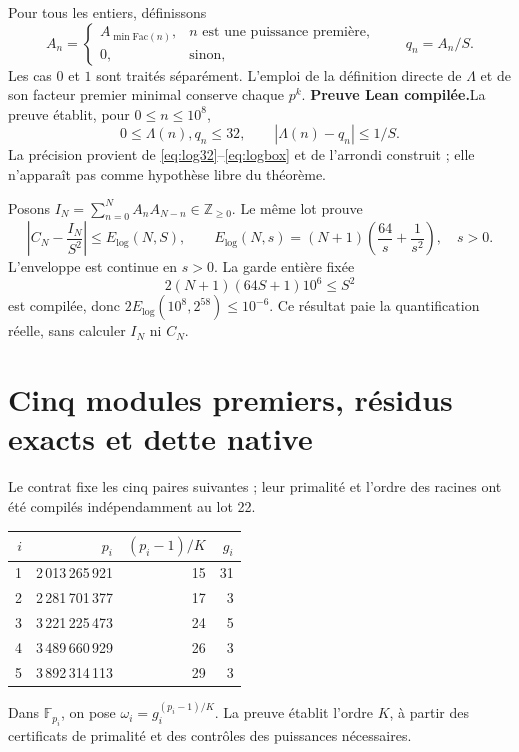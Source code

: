 \documentclass[11pt,a4paper]{article}
\theoremstyle{remark}
\newcommand{\Lam}{\Lambda}
\newcommand{\Z}{\mathbb Z}
\newcommand{\paid}{\textbf{Preuve Lean compilée.}\space}
\begin{document}
Pour tous les entiers, définissons
\[
A_n=\begin{cases}
A_{\min\mathrm{Fac}(n)},& n\text{ est une puissance première},\\
0,&\text{sinon},
\end{cases}\qquad q_n=A_n/S.
\]
Les cas $0$ et $1$ sont traités séparément. L'emploi de la définition directe
de $\Lam$ et de son facteur premier minimal conserve chaque $p^k$.
\paid La preuve établit, pour $0\le n\le10^8$,
\begin{equation}\label{eq:q-error}
0\le\Lam(n),q_n\le32,\qquad |\Lam(n)-q_n|\le 1/S.
\end{equation}
La précision provient de \eqref{eq:log32}--\eqref{eq:logbox} et de l'arrondi
construit ; elle n'apparaît pas comme hypothèse libre du théorème.

Posons $I_N=\sum_{n=0}^{N}A_nA_{N-n}\in\Z_{\ge0}$. Le même lot prouve
\begin{equation}\label{eq:E-log}
\left|C_N-\frac{I_N}{S^2}\right|\le E_{\log}(N,S),\qquad
E_{\log}(N,s)=(N+1)\left(\frac{64}{s}+\frac1{s^2}\right),\quad s>0.
\end{equation}
L'enveloppe est continue en $s>0$. La garde entière fixée
\begin{equation}\label{eq:q-guard}
2(N+1)(64S+1)10^6\le S^2
\end{equation}
est compilée, donc $2E_{\log}(10^8,2^{58})\le10^{-6}$. Ce résultat paie
la quantification réelle, sans calculer $I_N$ ni $C_N$.

\clearpage
\section{Cinq modules premiers, résidus exacts et dette native}\label{sec:crt}
Le contrat fixe les cinq paires suivantes ; leur primalité et l'ordre
des racines ont été compilés indépendamment au lot 22.
\begin{center}
\begin{tabular}{@{}rrrr@{}}
\toprule
$i$ & $p_i$ & $(p_i-1)/K$ & $g_i$\\
\midrule
1 & 2\,013\,265\,921 & 15 & 31\\
2 & 2\,281\,701\,377 & 17 & 3\\
3 & 3\,221\,225\,473 & 24 & 5\\
4 & 3\,489\,660\,929 & 26 & 3\\
5 & 3\,892\,314\,113 & 29 & 3\\
\bottomrule
\end{tabular}
\end{center}
Dans $\mathbb F_{p_i}$, on pose
$\omega_i=g_i^{(p_i-1)/K}$. La preuve établit l'ordre $K$, à partir
des certificats de primalité et des contrôles des puissances nécessaires.
\end{document}
